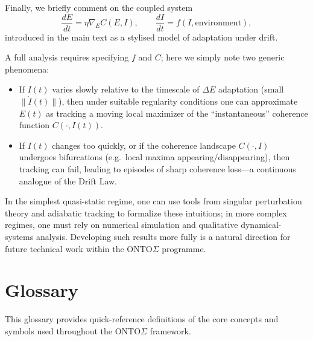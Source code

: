 \documentclass[12pt,a4paper]{report}
\begin{document}
Finally, we briefly comment on the coupled system
\[
    \frac{dE}{dt} = \eta \nabla_E C(E, I), \qquad
    \frac{dI}{dt} = f(I, \text{environment}),
\]
introduced in the main text as a stylised model of adaptation under drift.

A full analysis requires specifying \(f\) and \(C\); here we simply note two generic phenomena:

\begin{itemize}[leftmargin=2em]
    \item If \(I(t)\) varies slowly relative to the timescale of $\Delta E$ adaptation (small \(\|\dot{I}(t)\|\)), then under suitable regularity conditions one can approximate \(E(t)\) as tracking a moving local maximizer of the ``instantaneous'' coherence function \(C(\cdot, I(t))\).
    \item If \(I(t)\) changes too quickly, or if the coherence landscape \(C(\cdot, I)\) undergoes bifurcations (e.g.\ local maxima appearing/disappearing), then tracking can fail, leading to episodes of sharp coherence loss---a continuous analogue of the Drift Law.
\end{itemize}

In the simplest quasi-static regime, one can use tools from singular perturbation theory and adiabatic tracking to formalize these intuitions; in more complex regimes, one must rely on numerical simulation and qualitative dynamical-systems analysis. Developing such results more fully is a natural direction for future technical work within the ONTO$\Sigma$ programme.


\chapter{Glossary}
\label{appendix:glossary}

This glossary provides quick-reference definitions of the core concepts and symbols used throughout the ONTO$\Sigma$ framework.
\end{document}
